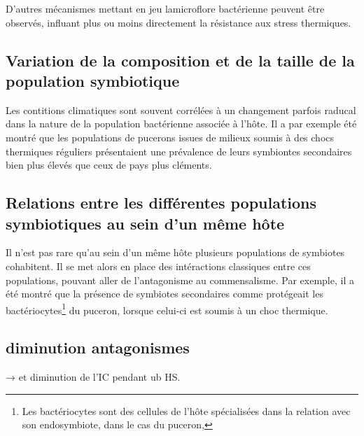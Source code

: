 D'autres mécanismes mettant en jeu lamicroflore bactérienne peuvent être
observés, influant plus ou moins directement la résistance aux stress
thermiques.

\subsection{Variation de la composition et de la taille de la population symbiotique} %
\label{sub:taillepop}

Les contitions climatiques sont souvent corrélées à un changement parfois
raducal dans la nature de la population bactérienne associée à l'hôte. Il a
par exemple été montré \cite{harmon2009} que les populations de pucerons
issues de milieux soumis à des chocs thermiques réguliers présentaient une
prévalence de leurs symbiontes secondaires bien plus élevés que ceux de pays
plus cléments.

\subsection{Relations entre les différentes populations symbiotiques au sein d'un même hôte} 
\label{sub:sociologie_des_symbiotes}

Il n'est pas rare qu'au sein d'un même hôte plusieurs populations de symbiotes
cohabitent. Il se met alors en place des intéractions classiques entre ces
populations, pouvant aller de l'antagonisme au commensalisme. Par exemple, il
a été montré \cite{montllor2002} que la présence de symbiotes secondaires
comme  protégeait les bactériocytes\footnote{Les
bactériocytes sont des cellules de l'hôte spécialisées dans la relation avec
son endosymbiote, dans le cas du puceron, } du puceron,
lorsque celui-ci est soumis à un choc thermique.

\subsection{diminution antagonismes} %
\label{sub:diminution_antagonismes}

→  et diminution de l'IC pendant ub HS.

